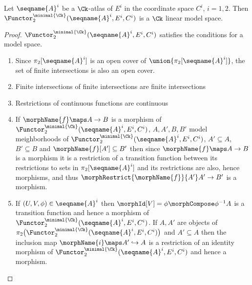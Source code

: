\documentclass{article}
\begin{document}
\begin{lemma}
\label{lem:Ck-ismodC}
Let $\seqname{A}^i$ be a $\Ck$-atlas of $E^i$ in the coordinate space
$C^i$, $i=1,2$. Then
$\Functor^{\minimal{\Ck}}_2 (\seqname{A}^i, E^i, C^i)$ is a $\Ck$ linear
model space.

\begin{proof}
$\Functor^{\minimal{\Ck}}_2 (\seqname{A}^i, E^i, C^i)$ satisfies the
conditions for a model space.
\begin{enumerate}
\item Since $\pi_2[\seqname{A}^i]$ is an open cover of
$\union{\pi_2[\seqname{A}^i]}$, the set of finite intersections is also an
open cover.

\item Finite intersections of finite intersections are finite intersections

\item Restrictions of continuous functions are continuous

\item If $\morphName{f} \maps A \to B$ is a morphism of
$\Functor^{\minimal{\Ck}}_2 (\seqname{A}^i, E^i, C^i)$,
$A, A', B, B'$ model meighborhoods of
$\Functor^{\minimal{\Ck}}_2 (\seqname{A}^i, E^i, C^i)$,
$A' \subseteq A$, $B' \subseteq B$ and $\morphName{f}[A'] \subseteq B'$ then since
$\morphName{f} \maps A \to B$ is a morphism it is a restriction of a transition
function between its restrictions to sets in $\pi_2[\seqname{A}^i]$ and
its restrictions are also, hence morphisms, and thus
$\morphRestrict{\morphName{f}}{A'} A' \to B'$ is a morphism.

\item
If $(U,V,\phi) \in \seqname{A}^i$ then $\morphId[{V}] = \phi \morphCompose \phi^{-1}A$
is a transition function and hence a morphism of
$\Functor^{\minimal{\Ck}}_2 (\seqname{A}^i, E^i, C^i)$. If $A, A'$ are
objects of
$
  \pi_2
    \bigl (
      \Functor^{\minimal{\Ck}}_2
        (\seqname{A}^i, E^i, C^i)
    \bigr )
$
and $A' \subseteq A$ then the inclusion map
$\morphName{i} \maps A' \hookrightarrow A$ is a restriction of an
identity morphism of
$
  \Functor^{\minimal{\Ck}}_2
    (\seqname{A}^i, E^i, C^i)
$
and hence a morphism.


\end{enumerate}
\end{proof}
\end{lemma}
\end{document}
